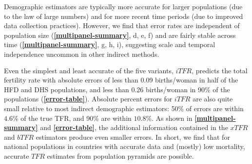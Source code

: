 \documentclass[12pt]{article}
\begin{document}
Demographic estimators are typically more accurate for larger
populations (due to the law of large numbers) and for more recent time
periods (due to improved data collection practices). However, we find
that error rates are independent of population size
(\textbf{\autoref{multipanel-summary}}, d, e, f) and are fairly stable
across time (\textbf{\autoref{multipanel-summary}}, g, h, i), suggesting
scale and temporal independence uncommon in other indirect methods.

Even the simplest and least accurate of the five variants, \(iTFR\),
predicts the total fertility rate with absolute errors of less than 0.09
births/woman in half of the HFD and DHS populations, and less than 0.26
births/woman in 90\% of the populations
(\textbf{\autoref{error-table}}). Absolute percent errors for \(iTFR\)
are also quite small relative to most indirect demographic estimators:
50\% of errors are within \(4.6\)\% of the true TFR, and 90\% are within
\(10.8\)\%. As shown in \textbf{\autoref{multipanel-summary}} and
\textbf{\autoref{error-table}}, the additional information contained in
the \(xTFR\) and \(bTFR\) estimators produce even smaller errors. In
short, we find that for national populations in countries with accurate
data and (mostly) low mortality, accurate \(TFR\) estimates from
population pyramids are possible.
\end{document}
